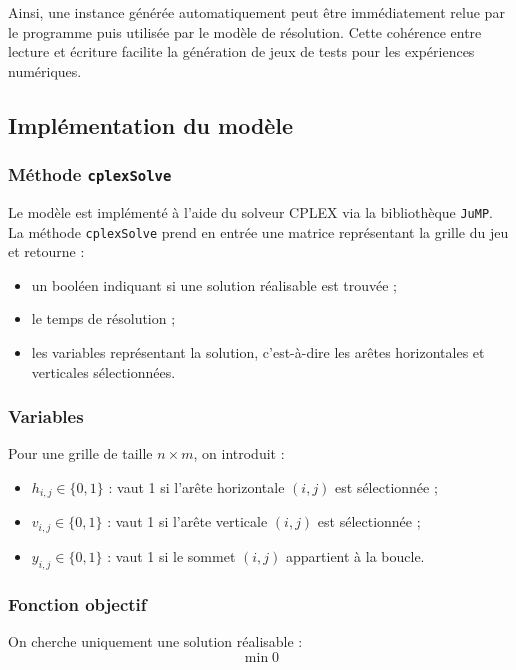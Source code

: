 Ainsi, une instance générée automatiquement peut être immédiatement relue par le programme puis utilisée par le modèle de résolution. Cette cohérence entre lecture et écriture facilite la génération de jeux de tests pour les expériences numériques.

\subsection{Implémentation du modèle}

\subsubsection{Méthode \texttt{cplexSolve}}

Le modèle est implémenté à l'aide du solveur CPLEX via la bibliothèque \texttt{JuMP}. La méthode \texttt{cplexSolve} prend en entrée une matrice représentant la grille du jeu et retourne :
\begin{itemize}
    \item un booléen indiquant si une solution réalisable est trouvée ;
    \item le temps de résolution ;
    \item les variables représentant la solution, c'est-à-dire les arêtes horizontales et verticales sélectionnées.
\end{itemize}

\subsubsection{Variables}

Pour une grille de taille \(n \times m\), on introduit :
\begin{itemize}
    \item \(h_{i,j} \in \{0,1\}\) : vaut 1 si l'arête horizontale \((i,j)\) est sélectionnée ;
    \item \(v_{i,j} \in \{0,1\}\) : vaut 1 si l'arête verticale \((i,j)\) est sélectionnée ;
    \item \(y_{i,j} \in \{0,1\}\) : vaut 1 si le sommet \((i,j)\) appartient à la boucle.
\end{itemize}

\subsubsection{Fonction objectif}

On cherche uniquement une solution réalisable :
\[
\min 0
\]

